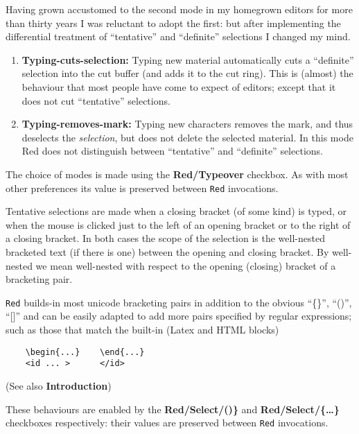 \documentclass[12pt,a4paper]{article}
\begin{document}
Having grown accustomed to the second mode in my homegrown editors for
more than thirty years I was reluctant to adopt the first: but after
implementing the differential treatment of ``tentative'' and
``definite'' selections I changed my mind.

\begin{enumerate}
\def\labelenumi{\arabic{enumi}.}
\item
  \textbf{Typing-cuts-selection:} Typing new material automatically cuts
  a ``definite'' selection into the cut buffer (and adds it to the cut
  ring). This is (almost) the behaviour that most people have come to
  expect of editors; except that it does not cut ``tentative''
  selections.
\item
  \textbf{Typing-removes-mark:} Typing new characters removes the mark,
  and thus deselects the \emph{selection}, but does not delete the
  selected material. In this mode Red does not distinguish between
  ``tentative'' and ``definite'' selections.
\end{enumerate}

The choice of modes is made using the \textbf{Red/Typeover} checkbox. As
with most other preferences its value is preserved between \texttt{Red}
invocations.

Tentative selections are made when a closing bracket (of some kind) is
typed, or when the mouse is clicked just to the left of an opening
bracket or to the right of a closing bracket. In both cases the scope of
the selection is the well-nested bracketed text (if there is one)
between the opening and closing bracket. By well-nested we mean
well-nested with respect to the opening (closing) bracket of a
bracketing pair.

\texttt{Red} builds-in most unicode bracketing pairs in addition to the
obvious ``\{\}'', ``()'', ``{[}{]}'' and can be easily adapted to add
more pairs specified by regular expressions; such as those that match
the built-in (Latex and HTML blocks)

\begin{verbatim}
    \begin{...}    \end{...}
    <id ... >      </id>       
\end{verbatim}

(See also \textbf{Introduction})

These behaviours are enabled by the \textbf{Red/Select/(\ldots@)\}} and
\textbf{Red/Select/\{\ldots\}} checkboxes respectively: their values are
preserved between \texttt{Red} invocations.
\end{document}
